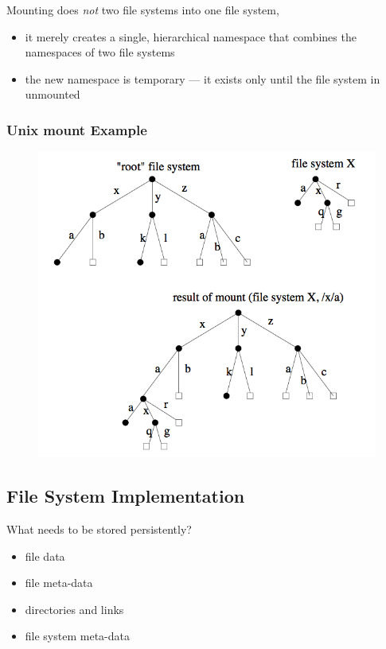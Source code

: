 \documentclass[12pt]{article}
\theoremstyle{plain}
\theoremstyle{definition}
\begin{document}
Mounting does \emph{not} two file systems into one file system,
\begin{itemize}
  \item it merely creates a single, hierarchical namespace that combines the namespaces of two file systems
  \item the new namespace is temporary --- it exists only until the file system in unmounted
\end{itemize}

\subsubsection{Unix mount Example}
\begin{figure}[H]
  \centering
  \includegraphics[scale=0.9]{pictures/unix_mount.png}
\end{figure}

\subsection{File System Implementation}
What needs to be stored persistently?
\begin{itemize}
  \item file data
  \item file meta-data
  \item directories and links
  \item file system meta-data
\end{itemize}
\end{document}
